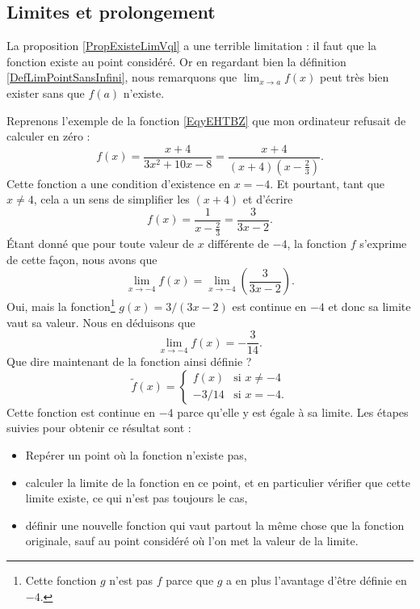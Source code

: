 \subsection{Limites et prolongement}

La proposition \ref{PropExisteLimVql} a une terrible limitation : il faut que la fonction existe au point considéré. Or en regardant bien la définition \ref{DefLimPointSansInfini}, nous remarquons que $\lim_{x\to a}f(x)$ peut très bien exister sans que $f(a)$ n'existe.

Reprenons l'exemple de la fonction \eqref{EqyEHTBZ} que mon ordinateur refusait de calculer en zéro :
\begin{equation}
f(x)=\frac{ x+4 }{ 3x^2+10x-8 }=\frac{ x+4 }{ (x+4)\left( x-\frac{ 2 }{ 3 } \right) }.
\end{equation}
Cette fonction a une condition d'existence en $x=-4$. Et pourtant, tant que $x\neq 4$, cela a un sens de simplifier les $(x+4)$ et d'écrire
\[ 
  f(x)=\frac{ 1 }{ x-\frac{ 2 }{ 3 } }=\frac{ 3 }{ 3x-2 }.
\]
Étant donné que pour toute valeur de $x$ différente de $-4$, la fonction $f$ s'exprime de cette façon, nous avons que
\[ 
  \lim_{x\to -4}f(x)=\lim_{x\to -4}\left(\frac{ 3 }{ 3x-2 }\right).
\]
Oui, mais la fonction\footnote{Cette fonction $g$ n'est pas $f$ parce que $g$ a en plus l'avantage d'être définie en $-4$.} $g(x)=3/(3x-2)$ est continue en $-4$ et donc sa limite vaut sa valeur. Nous en déduisons que
\[ 
  \lim_{x\to -4}f(x)=-\frac{ 3 }{ 14 }.
\]
Que dire maintenant de la fonction ainsi définie ?
\begin{equation}
\tilde f(x)=
\begin{cases}
f(x)&\text{si $x\neq -4$}\\
-3/14&\text{si $x=-4$}.
\end{cases}
\end{equation}
Cette fonction est continue en $-4$ parce qu'elle y est égale à sa limite. Les étapes suivies pour obtenir ce résultat sont :
\begin{itemize}
\item Repérer un point où la fonction n'existe pas,
\item calculer la limite de la fonction en ce point, et en particulier vérifier que cette limite existe, ce qui n'est pas toujours le cas,
\item définir une nouvelle fonction qui vaut partout la même chose que la fonction originale, sauf au point considéré où l'on met la valeur de la limite.
\end{itemize}
